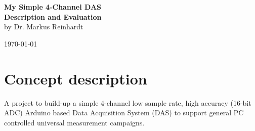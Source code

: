 \documentclass[11pt, oneside]{scrartcl}   	%
\begin{document}
\begingroup
	\thispagestyle{empty}
	\centering
	\par\normalfont\fontsize{30}{30}\sffamily\selectfont
	\vspace*{1.0cm}
	{\color{blue}
		\textbf{\Huge My Simple 4-Channel DAS} \\ 
		\textbf{\huge Description and Evaluation} \\
		\vspace*{0.5cm}
		\hspace{-0.3cm}
		{\textbf\huge by Dr. Markus Reinhardt }\par %
		\hspace{-1.3cm}
		{\textbf \huge  \today}\par %
		\vspace*{1.5cm}
	}
\endgroup
\vfill

\newpage
\thispagestyle{empty}
\tableofcontents
\newpage

\newpage
\thispagestyle{empty}
\listoffigures
\listoftables

\newpage
\pagestyle{scrheadings}
\section{Concept description}
A project to build-up a simple 4-channel low sample rate, high accuracy (16-bit ADC)
Arduino based Data Acquisition System (DAS) to support general PC controlled universal 
measurement campaigns.\\
\end{document}
